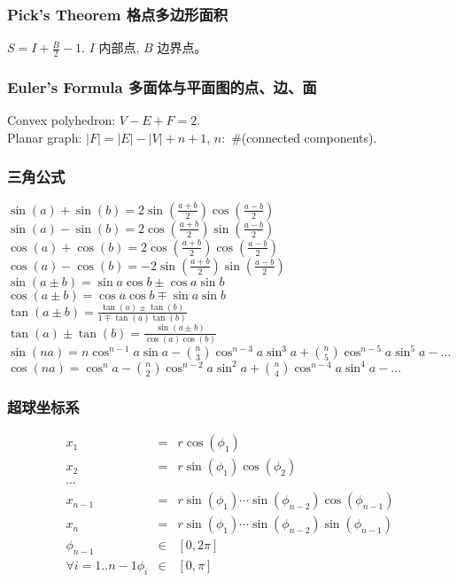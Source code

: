 \begin{small}
\begin{spacing}{0.5}
\begin{multicols*}{2}
\subsubsection{Pick's Theorem 格点多边形面积}
$S=I+\frac{B}{2}-1.$ $I$ 内部点, $B$ 边界点。
\subsubsection{Euler's Formula 多面体与平面图的点、边、面}
Convex polyhedron: $V-E+F=2$. \\
Planar graph: $|F|=|E|-|V|+n+1$, $n:$ \#(connected components).
\end{multicols*}
\subsubsection{三角公式}
\noindent
$
\sin(a) + \sin(b) = 2\sin(\frac{a + b}{2})\cos(\frac{a - b}{2})
$ \\
$
\sin(a) - \sin(b) = 2\cos(\frac{a + b}{2})\sin(\frac{a - b}{2})
$ \\
$
\cos(a) + \cos(b) = 2\cos(\frac{a + b}{2})\cos(\frac{a - b}{2})
$ \\
$
\cos(a) - \cos(b) = -2\sin(\frac{a + b}{2})\sin(\frac{a - b}{2})
$ \\
$
\sin(a \pm b) = \sin a \cos b \pm \cos a \sin b
$ \\
$
\cos(a \pm b) = \cos a \cos b \mp \sin a \sin b
$ \\
$
\tan(a \pm b) = \frac{\tan(a)\pm\tan(b)}{1 \mp \tan(a)\tan(b)}
$ \\
$
\tan(a) \pm \tan(b) = \frac{\sin(a \pm b)}{\cos(a)\cos(b)}
$ \\
$
\sin(na) = n\cos^{n-1}a\sin a - \binom{n}{3}\cos^{n-3}a \sin^3a + \binom{n}{5}\cos^{n-5}a\sin^5a - \dots
$\\
$
\cos(na) = \cos^{n}a - \binom{n}{2}\cos^{n-2}a \sin^2a + \binom{n}{4}\cos^{n-4}a\sin^4a - \dots
$
\subsubsection{超球坐标系}
\begin{eqnarray*}
 	x_1 &=& r\cos(\phi_1) \\ 
	x_2 &=& r\sin(\phi_1)\cos(\phi_2) \\
	\cdots\\
	x_{n-1} &=& r\sin(\phi_1)\cdots\sin(\phi_{n-2})\cos(\phi_{n-1}) \\
	x_n &=& r\sin(\phi_1)\cdots\sin(\phi_{n-2})\sin(\phi_{n-1}) \\
	\phi_{n-1} &\in& [0,2\pi]\\
	\forall {i=1..{n-1}}\phi_i &\in& [0,\pi]\\
\end{eqnarray*}

\end{spacing}
\end{small}
